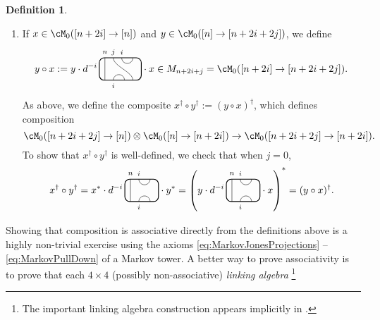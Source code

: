 \documentclass[11pt]{article}
\theoremstyle{plain}
\theoremstyle{definition}
\newtheorem{defn}[thm]{Definition}
\begin{document}
\begin{defn}
\begin{itemize}
\begin{enumerate}[label={\rm(C\arabic*)}]
\item
\label{compose:downup}
If $x\in \cM_0([n+2i] \to [n])$ and $y\in \cM_0([n] \to [n+2i+2j])$, we define
$$
y\circ x 
:=
y\cdot
d^{-i}\,
\begin{tikzpicture}[baseline = .3cm]
 \draw[thick, rounded corners = 5pt] (0,0) rectangle (1.5,.8);
 \draw (.2,0) -- (.2,.8);
 \draw (.8,.8) arc (-180:0:.2cm);
 \draw (1.2,0) .. controls ++(90:.3cm) and ++(270:.3cm) .. (.5,.8);
 \draw (.5,0) arc (180:0:.2cm);
 \node at (.2,1) {\scriptsize{$n$}};
 \node at (.5,1) {\scriptsize{$j$}};
 \node at (.8,1) {\scriptsize{$i$}};
 \node at (.5,-.2) {\scriptsize{$i$}};
\end{tikzpicture}
\cdot x
\in
M_{n+2i+j}
=
\cM_0([n+2i] \to [n+2i+2j]).
$$
As above, we define the composite $x^\dag \circ y^\dag := (y\circ x)^\dag$, which defines composition
$$
\cM_0([n+2i+2j] \to [n]) \otimes \cM_0([n] \to [n+2i]) \to \cM_0([n+2i+2j] \to [n+2i]).
$$
To show that $x^\dag \circ y^\dag$ is well-defined, we check that when $j=0$, 
\begin{equation}
\label{eq:n+2j to n to n+2j}
x^\dag \circ y^\dag 
=
x^* \cdot
d^{-i}\,
\begin{tikzpicture}[baseline = .3cm]
 \draw[thick, rounded corners = 5pt] (0,0) rectangle (1.2,.8);
 \draw (.2,0) -- (.2,.8);
 \draw (.5,.8) arc (-180:0:.2cm);
 \draw (.5,0) arc (180:0:.2cm);
 \node at (.2,1) {\scriptsize{$n$}};
 \node at (.5,1) {\scriptsize{$i$}};
 \node at (.5,-.2) {\scriptsize{$i$}};
\end{tikzpicture}
\cdot y^*
=
\left(
y \cdot
d^{-i}\,
\begin{tikzpicture}[baseline = .3cm]
 \draw[thick, rounded corners = 5pt] (0,0) rectangle (1.2,.8);
 \draw (.2,0) -- (.2,.8);
 \draw (.5,.8) arc (-180:0:.2cm);
 \draw (.5,0) arc (180:0:.2cm);
 \node at (.2,1) {\scriptsize{$n$}};
 \node at (.5,1) {\scriptsize{$i$}};
 \node at (.5,-.2) {\scriptsize{$i$}};
\end{tikzpicture}
\cdot x
\right)^*
=
(y\circ x)^\dag.
\end{equation}
\end{enumerate}
\end{itemize}
Showing that composition is associative directly from the definitions above is a highly non-trivial exercise using the axioms \ref{eq:MarkovJonesProjections} -- \ref{eq:MarkovPullDown} of a Markov tower.
A better way to prove associativity is to prove that each $4\times 4$ (possibly non-associative) \emph{linking algebra} \cite[Proof of Prop.~1.14]{MR808930}\footnote{The important linking algebra construction appears implicitly in \cite[Proof of Prop.~1.14]{MR808930}.}

\end{defn}
\end{document}
